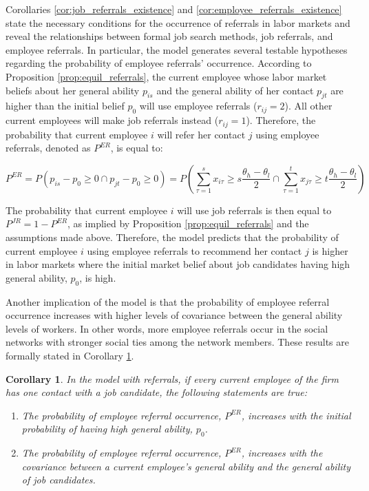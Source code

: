 \documentclass[12pt]{article}
\newtheorem{corollary}[theorem]{Corollary}
\begin{document}
Corollaries \ref{cor:job_referrals_existence} and \ref{cor:employee_referrals_existence} state the necessary conditions for the occurrence of referrals in labor markets and reveal the relationships between formal job search methods, job referrals, and employee referrals. In particular, the model generates several testable hypotheses regarding the probability of employee referrals' occurrence. According to Proposition \ref{prop:equil_referrals}, the current employee whose labor market beliefs about her general ability $p_{is}$ and the general ability of her contact $p_{jt}$ are higher than the initial belief $p_0$ will use employee referrals ($r_{ij} = 2$). All other current employees will make job referrals instead ($r_{ij}=1$). Therefore, the probability that current employee $i$ will refer her contact $j$ using employee referrals, denoted as $P^{ER}$, is equal to:

\begin{equation}\label{eq:prob_ER_occurence}
    P^{ER} = P(p_{is} - p_0 \geq 0 \cap p_{jt} - p_0 \geq 0) = P\left(\sum_{\tau =1}^s x_{i\tau} \geq s\frac{\theta_h - \theta_l}{2} \cap \sum_{\tau =1}^t x_{j\tau} \geq t\frac{\theta_h - \theta_l}{2}\right)
\end{equation}

The probability that current employee $i$ will use job referrals is then equal to $P^{JR} = 1 - P^{ER}$, as implied by Proposition \ref{prop:equil_referrals} and the assumptions made above. Therefore, the model predicts that the probability of current employee $i$ using employee referrals to recommend her contact $j$ is higher in labor markets where the initial market belief about job candidates having high general ability, $p_0$, is high.

Another implication of the model is that the probability of employee referral occurrence increases with higher levels of covariance between the general ability levels of workers. In other words, more employee referrals occur in the social networks with stronger social ties among the network members. These results are formally stated in Corollary \ref{cor:referrals_ER_share}.

\begin{corollary}\label{cor:referrals_ER_share}
    In the model with referrals, if every current employee of the firm has one contact with a job candidate, the following statements are true:
    \begin{enumerate}[label={\roman*})]
        \item The probability of employee referral occurrence, \(P^{ER}\), increases with the initial probability of having high general ability, \(p_0\).
        \item The probability of employee referral occurrence, \(P^{ER}\), increases with the covariance between a current employee's general ability and the general ability of job candidates.
    \end{enumerate}
\end{corollary}
\end{document}
